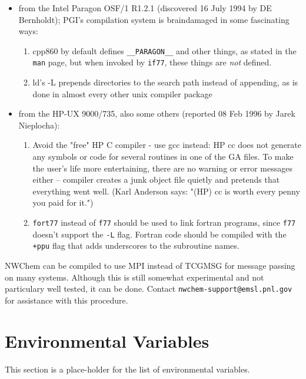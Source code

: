\begin{itemize}
\item from the Intel Paragon OSF/1 R1.2.1 (discovered 16 July 1994 by DE Bernholdt);
PGI's compilation system is braindamaged in some fascinating ways:
\begin{enumerate}
\item cpp860 by default defines {\tt \_\_PARAGON\_\_} and other things, as stated in
   the {\tt man} page, but when invoked by {\tt if77}, these things are {\em not} defined.
\item ld's -L prepends directories to the search path instead of
   appending, as is done in almost every other unix compiler package
\end{enumerate}

\item from the HP-UX 9000/735, also some others (reported 08 Feb 1996 by Jarek Nieplocha):

\begin{enumerate}
\item Avoid the "free" HP C compiler - use gcc instead:
HP cc does not generate any symbols or code for several routines in one of
the GA files. To make the user's life more entertaining, there are no 
warning or error messages either -- compiler creates a junk object file
quietly and pretends that everything went well.
(Karl Anderson says: "(HP) cc is worth every penny you paid for it.")

\item {\tt fort77} instead of {\tt f77} should be used to link fortran programs, since 
{\tt f77} doesn't support the {\tt -L} flag. Fortran code should be compiled with the 
{\tt +ppu} flag that adds underscores to the subroutine names.
\end{enumerate}

\end{itemize}


NWChem can be compiled to use MPI instead of TCGMSG for message
passing on many systems. Although this is still somewhat
experimental and not particulary well tested, it can be done.
Contact \verb+nwchem-support@emsl.pnl.gov+ for assistance with this
procedure.  

\section{Environmental Variables}
\label{sec:envar}

This section is a place-holder for the list of environmental variables.
